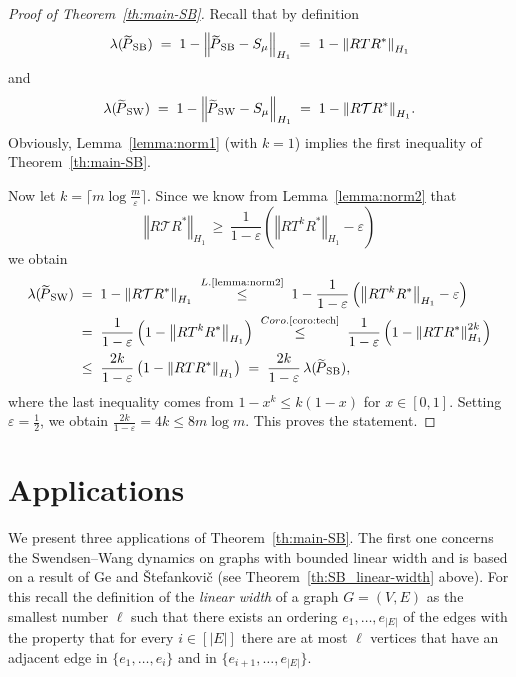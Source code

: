 \documentclass{dis}
\theoremstyle{citing}
\begin{document}
\begin{proof}[Proof of Theorem~\ref{th:main-SB}]
Recall that by definition 
\[
\lambda({{\raisebox{2pt}{ ${\widetilde{{}}}$ }\mkern-14mu P}_{\rm SB}}) \;=\; 1-{\left\Vert {{{\raisebox{2pt}{ ${\widetilde{{}}}$ }\mkern-14mu P}_{\rm SB}}-S_\mu} \right\Vert}_{H_1}
\;=\; 1-{\left\Vert {R T R^*} \right\Vert}_{H_1}
\]
and 
\[
\lambda({{\raisebox{2pt}{ ${\widetilde{{}}}$ }\mkern-14mu P}_{\rm SW}}) \;=\; 1-{\left\Vert {{{\raisebox{2pt}{ ${\widetilde{{}}}$ }\mkern-14mu P}_{\rm SW}}-S_\mu} \right\Vert}_{H_1}
\;=\; 1-{\left\Vert {R {\mathcal{T}} R^*} \right\Vert}_{H_1}.
\]
Obviously, Lemma~\ref{lemma:norm1} (with $k=1$) implies 
the first inequality of Theorem~\ref{th:main-SB}.

Now let $k = \lceil m \log\frac{m}{\varepsilon}\rceil$. 
Since we know from Lemma~\ref{lemma:norm2} that 
\[
{\left\Vert {R {\mathcal{T}} R^*} \right\Vert}_{H_1} \,\ge\, 
\frac{1}{1-{\varepsilon}}\left({\left\Vert {R T^k R^*} \right\Vert}_{H_1}-{\varepsilon}\right)
\]
we obtain
\[\begin{split}
\lambda({{\raisebox{2pt}{ ${\widetilde{{}}}$ }\mkern-14mu P}_{\rm SW}}) \;&=\; 1-{\left\Vert {R {\mathcal{T}} R^*} \right\Vert}_{H_1} 
\;\stackrel{L.\text{\scriptsize \ref{lemma:norm2}}}{\le}\; 
		1-\frac{1}{1-{\varepsilon}}\left({\left\Vert {R T^k R^*} \right\Vert}_{H_1}-{\varepsilon}\right) \\
&=\; \frac{1}{1-{\varepsilon}}\left(1-{\left\Vert {R T^k R^*} \right\Vert}_{H_1}\right)
\;\stackrel{Coro.\text{\scriptsize \ref{coro:tech}}}{\le}\; 
		\frac{1}{1-{\varepsilon}}\left(1-{\left\Vert {R T R^*} \right\Vert}_{H_1}^{2k}\right) \\
&\le\; \frac{2k}{1-{\varepsilon}}\left(1-{\left\Vert {R T R^*} \right\Vert}_{H_1}\right) 
\;=\; \frac{2k}{1-{\varepsilon}}\,\lambda({{\raisebox{2pt}{ ${\widetilde{{}}}$ }\mkern-14mu P}_{\rm SB}}), 
\end{split}\]
where the last inequality comes from $1-x^k\le k(1-x)$ for $x\in[0,1]$.
Setting ${\varepsilon}=\frac12$, we obtain 
$\frac{2k}{1-{\varepsilon}}=4k\le 8 m \log m$. This proves the statement.
\end{proof}

\vspace{2mm}

\section{Applications} \label{sec:4_app}

We present three applications of Theorem~\ref{th:main-SB}.
The first one concerns the Swendsen--Wang dynamics 
on graphs with bounded linear width 
and is based on a result of  Ge and {\v{S}}tefankovi{\v{c}} 
\cite{GeS} (see Theorem~\ref{th:SB_linear-width} above).
For this recall the definition of the \emph{linear width} 
of a graph $G=(V,E)$ as the smallest number $\ell$ such 
that there exists an ordering $e_1,\dots,e_{{\left\vert {E} \right\vert}}$ 
of the edges with the property that for every $i\in[{\left\vert {E} \right\vert}]$ 
there are at most $\ell$ vertices that have an adjacent edge 
in $\{e_1,\dots, e_i\}$ and in $\{e_{i+1},\dots, e_{{\left\vert {E} \right\vert}}\}$.
\end{document}
